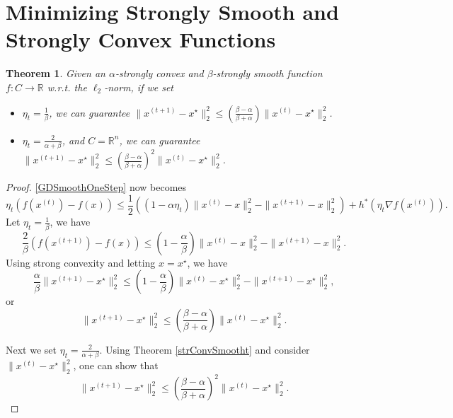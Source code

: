 \documentclass[openany]{book}
\newtheorem{theorem}{Theorem}[chapter]
\theoremstyle{definition}
\theoremstyle{remark}
\begin{document}
\section{Minimizing Strongly Smooth and Strongly Convex Functions}
\begin{theorem}
    Given an $\alpha$-strongly convex and $\beta$-strongly smooth function $f:C\to \mathbb{R}$ w.r.t. the $\ell_2$-norm, if we set
    \begin{itemize}
        \item $\eta_t=\frac{1}{\beta}$, we can guarantee $\|x^{(t+1)}-x^{\star}\|_2^2\le\left(\frac{\beta-\alpha}{\beta+\alpha}\right)\|x^{(t)}-x^{\star}\|_2^2$.
        \item $\eta_t=\frac{2}{\alpha+\beta}$, and $C=\mathbb{R}^n$, we can guarantee $\|x^{(t+1)}-x^{\star}\|_2^2\le\left(\frac{\beta-\alpha}{\beta+\alpha}\right)^2\|x^{(t)}-x^{\star}\|_2^2$.
    \end{itemize}
\end{theorem}
\begin{proof}
    \eqref{GDSmoothOneStep} now becomes
    \begin{equation*}
        \eta_t\left(f(x^{(t)})-f(x)\right)\le \frac{1}{2}\left((1-\alpha\eta_t)\|x^{(t)}-x\|_2^2-\|x^{(t+1)}-x\|_2^2\right)+h^*\left(\eta_t\nabla f(x^{(t)})\right).
    \end{equation*}
    Let $\eta_t=\frac{1}{\beta}$, we have
    \begin{equation*}
        \frac{2}{\beta}(f(x^{(t+1)})-f(x))\le\left(1-\frac{\alpha}{\beta}\right)\|x^{(t)}-x\|_2^2-\|x^{(t+1)}-x\|_2^2.
    \end{equation*}
    Using strong convexity and letting $x=x^{\star}$, we have
    \begin{equation*}
        \frac{\alpha}{\beta}\|x^{(t+1)}-x^{\star}\|_2^2\le\left(1-\frac{\alpha}{\beta}\right)\|x^{(t)}-x^{\star}\|_2^2-\|x^{(t+1)}-x^{\star}\|_2^2,
    \end{equation*}
    or
    \begin{equation*}
        \|x^{(t+1)}-x^{\star}\|_2^2\le\left(\frac{\beta-\alpha}{\beta+\alpha}\right)\|x^{(t)}-x^{\star}\|_2^2.
    \end{equation*}

    Next we set $\eta_t=\frac{2}{\alpha+\beta}$. Using Theorem \ref{strConvSmootht} and consider $\|x^{(t)}-x^{\star}\|_2^2$, one can show that
    \begin{equation*}
        \|x^{(t+1)}-x^{\star}\|_2^2\le\left(\frac{\beta-\alpha}{\beta+\alpha}\right)^2\|x^{(t)}-x^{\star}\|_2^2.
    \end{equation*}
\end{proof}
\end{document}
